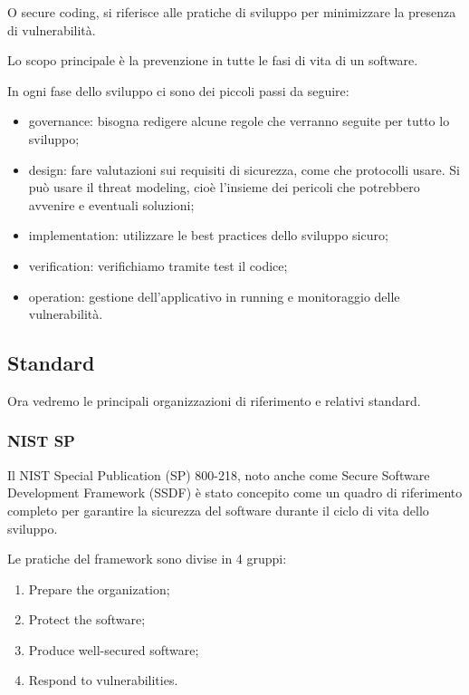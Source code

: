 \documentclass[
]{article}
\providecommand{\tightlist}{%
  \setlength{\itemsep}{0pt}\setlength{\parskip}{0pt}}
\begin{document}
{O secure coding, si riferisce alle pratiche di sviluppo per minimizzare
la presenza di vulnerabilità.}

{Lo scopo principale è la prevenzione in tutte le fasi di vita di un
software.}

{In ogni fase dello sviluppo ci sono dei piccoli passi da seguire:}

\begin{itemize}
\tightlist
\item
  {governance: bisogna redigere alcune regole che verranno seguite per
  tutto lo sviluppo;}
\item
  {design: fare valutazioni sui requisiti di sicurezza, come che
  protocolli usare. Si può usare il threat modeling, cioè l'insieme dei
  pericoli che potrebbero avvenire e eventuali soluzioni;}
\item
  {implementation: utilizzare le best practices dello sviluppo sicuro;}
\item
  {verification: verifichiamo tramite test il codice;}
\item
  {operation: gestione dell'applicativo in running e monitoraggio delle
  vulnerabilità.}
\end{itemize}

\subsection{\texorpdfstring{{Standard}}{Standard}}\label{h.517kgz1au4dw}

{Ora vedremo le principali organizzazioni di riferimento e relativi
standard.}

\subsubsection{\texorpdfstring{{NIST SP
}}{NIST SP }}\label{h.ilfsvy1f9zpn}

{Il NIST Special Publication (SP) 800-218, noto anche come Secure
Software Development Framework (SSDF) è stato concepito come un quadro
di riferimento completo per garantire la sicurezza del software durante
il ciclo di vita dello sviluppo.}

{}

{Le pratiche del framework sono divise in 4 gruppi:}

\begin{enumerate}
\tightlist
\item
  {Prepare the organization;}
\item
  {Protect the software;}
\item
  {Produce well-secured software;}
\item
  {Respond to vulnerabilities.}
\end{enumerate}
\end{document}

